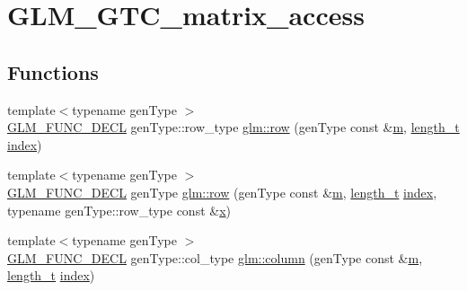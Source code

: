 \hypertarget{group__gtc__matrix__access}{}\section{G\+L\+M\+\_\+\+G\+T\+C\+\_\+matrix\+\_\+access}
\label{group__gtc__matrix__access}
\subsection*{Functions}
\begin{DoxyCompactItemize}
\item 
{\footnotesize template$<$typename gen\+Type $>$ }\\\mbox{\hyperlink{setup_8hpp_ab2d052de21a70539923e9bcbf6e83a51}{G\+L\+M\+\_\+\+F\+U\+N\+C\+\_\+\+D\+E\+CL}} gen\+Type\+::row\+\_\+type \mbox{\hyperlink{group__gtc__matrix__access_ga259e5ebd0f31ec3f83440f8cae7f5dba}{glm\+::row}} (gen\+Type const \&\mbox{\hyperlink{_s_d_l__opengl__glext_8h_af593500c283bf1a787a6f947f503a5c2}{m}}, \mbox{\hyperlink{namespaceglm_a090a0de2260835bee80e71a702492ed9}{length\+\_\+t}} \mbox{\hyperlink{_s_d_l__opengl__glext_8h_a57f14e05b1900f16a2da82ade47d0c6d}{index}})
\item 
{\footnotesize template$<$typename gen\+Type $>$ }\\\mbox{\hyperlink{setup_8hpp_ab2d052de21a70539923e9bcbf6e83a51}{G\+L\+M\+\_\+\+F\+U\+N\+C\+\_\+\+D\+E\+CL}} gen\+Type \mbox{\hyperlink{group__gtc__matrix__access_gaadcc64829aadf4103477679e48c7594f}{glm\+::row}} (gen\+Type const \&\mbox{\hyperlink{_s_d_l__opengl__glext_8h_af593500c283bf1a787a6f947f503a5c2}{m}}, \mbox{\hyperlink{namespaceglm_a090a0de2260835bee80e71a702492ed9}{length\+\_\+t}} \mbox{\hyperlink{_s_d_l__opengl__glext_8h_a57f14e05b1900f16a2da82ade47d0c6d}{index}}, typename gen\+Type\+::row\+\_\+type const \&\mbox{\hyperlink{_s_d_l__opengl_8h_ad0e63d0edcdbd3d79554076bf309fd47}{x}})
\item 
{\footnotesize template$<$typename gen\+Type $>$ }\\\mbox{\hyperlink{setup_8hpp_ab2d052de21a70539923e9bcbf6e83a51}{G\+L\+M\+\_\+\+F\+U\+N\+C\+\_\+\+D\+E\+CL}} gen\+Type\+::col\+\_\+type \mbox{\hyperlink{group__gtc__matrix__access_ga96022eb0d3fae39d89fc7a954e59b374}{glm\+::column}} (gen\+Type const \&\mbox{\hyperlink{_s_d_l__opengl__glext_8h_af593500c283bf1a787a6f947f503a5c2}{m}}, \mbox{\hyperlink{namespaceglm_a090a0de2260835bee80e71a702492ed9}{length\+\_\+t}} \mbox{\hyperlink{_s_d_l__opengl__glext_8h_a57f14e05b1900f16a2da82ade47d0c6d}{index}})

\end{DoxyCompactItemize}
